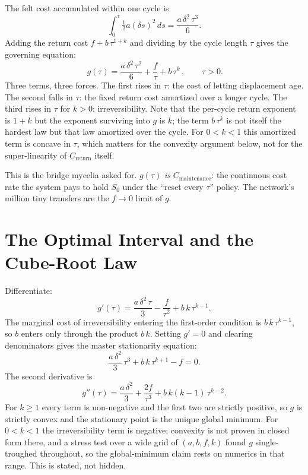 \documentclass[12pt]{article}
\begin{document}
The felt cost accumulated within one cycle is
\begin{equation}
\int_0^\tau \tfrac{1}{2}a(\delta s)^2\,ds=\frac{a\,\delta^2\,\tau^3}{6}.
\end{equation}
Adding the return cost $f+b\,\tau^{1+k}$ and dividing by the cycle length $\tau$ gives the governing equation:
\begin{equation}
\boxed{\,g(\tau)=\frac{a\,\delta^2\,\tau^2}{6}+\frac{f}{\tau}+b\,\tau^{k}\,},\qquad \tau>0.
\end{equation}
Three terms, three forces. The first rises in $\tau$: the cost of letting displacement age. The second falls in $\tau$: the fixed return cost amortized over a longer cycle. The third rises in $\tau$ for $k>0$: irreversibility. Note that the per-cycle return exponent is $1+k$ but the exponent surviving into $g$ is $k$; the term $b\,\tau^{k}$ is not itself the hardest law but that law amortized over the cycle. For $0<k<1$ this amortized term is concave in $\tau$, which matters for the convexity argument below, not for the super-linearity of $C_{\text{return}}$ itself.

This is the bridge mycelia asked for. $g(\tau)$ \emph{is} $C_{\text{maintenance}}$: the continuous cost rate the system pays to hold $S_0$ under the ``reset every $\tau$'' policy. The network's million tiny transfers are the $f\to 0$ limit of $g$.

\section{The Optimal Interval and the Cube-Root Law}

Differentiate:
\begin{equation}
g'(\tau)=\frac{a\,\delta^2\,\tau}{3}-\frac{f}{\tau^2}+b\,k\,\tau^{k-1}.
\end{equation}
The marginal cost of irreversibility entering the first-order condition is $b\,k\,\tau^{k-1}$, so $b$ enters only through the product $b\,k$. Setting $g'=0$ and clearing denominators gives the master stationarity equation:
\begin{equation}
\frac{a\,\delta^2}{3}\,\tau^3+b\,k\,\tau^{k+1}-f=0.
\end{equation}
The second derivative is
\begin{equation}
g''(\tau)=\frac{a\,\delta^2}{3}+\frac{2f}{\tau^3}+b\,k(k-1)\,\tau^{k-2}.
\end{equation}
For $k\ge 1$ every term is non-negative and the first two are strictly positive, so $g$ is strictly convex and the stationary point is the unique global minimum. For $0<k<1$ the irreversibility term is negative; convexity is not proven in closed form there, and a stress test over a wide grid of $(a,b,f,k)$ found $g$ single-troughed throughout, so the global-minimum claim rests on numerics in that range. This is stated, not hidden.
\end{document}
